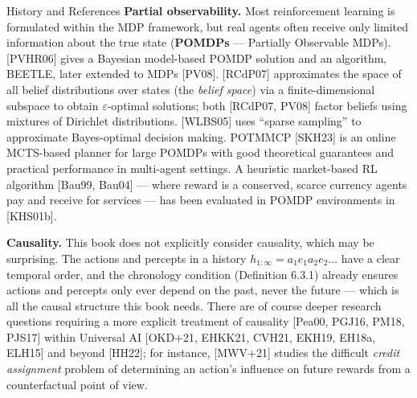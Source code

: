 \documentclass[aspectratio=169,10pt]{beamer}
\begin{document}
\begin{frame}[allowframebreaks]{History and References}
  \vspace{2mm}
  \textbf{Partial observability.} Most reinforcement learning is
  formulated within the MDP framework, but real agents often receive only
  limited information about the true state (\textbf{POMDPs} --- Partially
  Observable MDPs). [PVHR06] gives a Bayesian model-based POMDP solution
  and an algorithm, BEETLE, later extended to MDPs [PV08]. [RCdP07]
  approximates the space of all belief distributions over states (the
  \emph{belief space}) via a finite-dimensional subspace to obtain
  $\varepsilon$-optimal solutions; both [RCdP07, PV08] factor beliefs using
  mixtures of Dirichlet distributions. [WLBS05] uses ``sparse sampling'' to
  approximate Bayes-optimal decision making. POTMMCP [SKH23] is an
  online MCTS-based planner for large POMDPs with good theoretical
  guarantees and practical performance in multi-agent settings. A
  heuristic market-based RL algorithm [Bau99, Bau04] --- where reward is a
  conserved, scarce currency agents pay and receive for services --- has
  been evaluated in POMDP environments in [KHS01b].

  \framebreak
  \textbf{Causality.} This book does not explicitly consider causality,
  which may be surprising. The actions and percepts in a history
  $h_{1:\infty}=a_1e_1a_2e_2\dots$ have a clear temporal order, and the
  chronology condition (Definition 6.3.1) already ensures actions and
  percepts only ever depend on the past, never the future --- which is all
  the causal structure this book needs. There are of course deeper research
  questions requiring a more explicit treatment of causality [Pea00, PGJ16,
  PM18, PJS17] within Universal AI [OKD+21, EHKK21, CVH21, EKH19, EH18a,
  ELH15] and beyond [HH22]; for instance, [MWV+21] studies the difficult
  \emph{credit assignment} problem of determining an action's influence on
  future rewards from a counterfactual point of view.
\end{frame}
\end{document}
